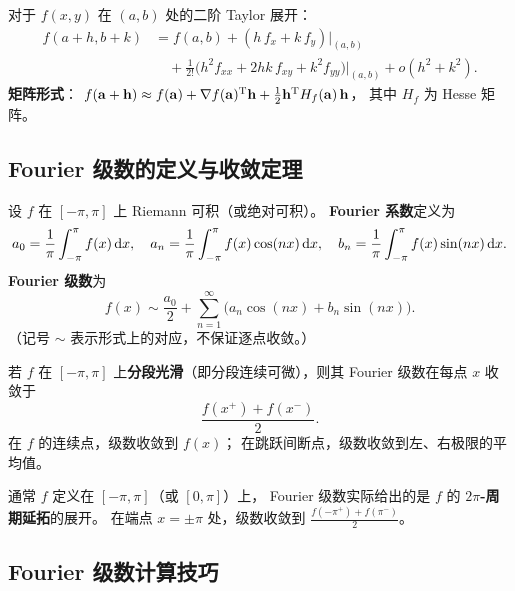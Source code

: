 \documentclass{ctexart}
\begin{document}
\begin{remark}[二元情形的实用公式]
  对于 $f(x,y)$ 在 $(a,b)$ 处的二阶 Taylor 展开：
  \begin{align*}
    f(a+h, b+k) &= f(a,b) + (h\,f_x + k\,f_y)\big|_{(a,b)} \\
    &\quad + \frac{1}{2!}\bigl(h^2 f_{xx} + 2hk\, f_{xy} + k^2 f_{yy}\bigr)\big|_{(a,b)}
    + o(h^2+k^2).
  \end{align*}
  \textbf{矩阵形式}：
  $f(\mathbf{a}+\mathbf{h}) \approx f(\mathbf{a})
  + \nabla f(\mathbf{a})^{\mathrm{T}} \mathbf{h}
  + \frac{1}{2} \mathbf{h}^{\mathrm{T}} H_f(\mathbf{a})\, \mathbf{h}$，
  其中 $H_f$ 为 Hesse 矩阵。
\end{remark}

\subsection{Fourier 级数的定义与收敛定理}

\begin{definition}
  设 $f$ 在 $[-\pi, \pi]$ 上 Riemann 可积（或绝对可积）。
  \textbf{Fourier 系数}定义为
  \[
    a_0 = \frac{1}{\pi} \int_{-\pi}^{\pi} f(x) \,\mathrm{d} x, \quad
    a_n = \frac{1}{\pi} \int_{-\pi}^{\pi} f(x)\cos(nx) \,\mathrm{d} x, \quad
    b_n = \frac{1}{\pi} \int_{-\pi}^{\pi} f(x)\sin(nx) \,\mathrm{d} x.
  \]
  \textbf{Fourier 级数}为
  \[
    f(x) \sim \frac{a_0}{2} + \sum_{n=1}^\infty \bigl( a_n\cos(nx) + b_n\sin(nx) \bigr).
  \]
  （记号 $\sim$ 表示形式上的对应，不保证逐点收敛。）
\end{definition}

\begin{theorem}
  若 $f$ 在 $[-\pi,\pi]$ 上\textbf{分段光滑}（即分段连续可微），则其 Fourier 级数在每点 $x$ 收敛于
  \[
    \frac{f(x^+) + f(x^-)}{2}.
  \]
  在 $f$ 的连续点，级数收敛到 $f(x)$；
  在跳跃间断点，级数收敛到左、右极限的平均值。
\end{theorem}

\begin{remark}[周期延拓]
  通常 $f$ 定义在 $[-\pi,\pi]$（或 $[0,\pi]$）上，
  Fourier 级数实际给出的是 $f$ 的 \textbf{$2\pi$-周期延拓}的展开。
  在端点 $x = \pm\pi$ 处，级数收敛到 $\frac{f(-\pi^+) + f(\pi^-)}{2}$。
\end{remark}

\subsection{Fourier 级数计算技巧}
\end{document}
